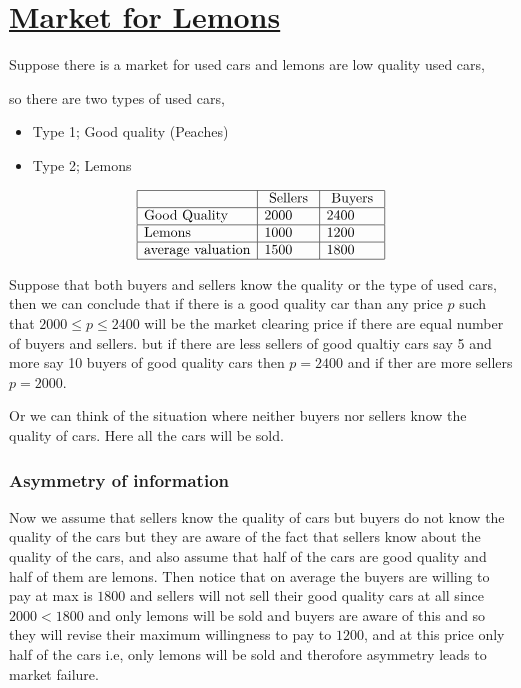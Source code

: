 \documentclass[12pt,a4paper]{article}
\begin{document}
 \section{\underline{Market for Lemons}} 
Suppose there is a market for used cars and lemons are low quality used cars,

so there are two types of used cars, 

\begin{itemize}
    \item Type 1; Good quality (Peaches)

    \item Type 2; Lemons
\end{itemize}

 \begin{align*}
    \begin{array}{|l|l|l|}
    \hline & \text{ Sellers } & \text { Buyers } \\
    \hline \text{Good Quality} & 2000 & 2400 \\
    \hline \text{Lemons} & 1000 & 1200\\
    \hline \text{average valuation} & 1500 & 1800\\
    \hline
    \end{array}
    \end{align*}

Suppose that both buyers and sellers know the quality or the type of used cars, then we can conclude that if there is a good quality car than any price \(p\) such that \(2000 \leq p \leq 2400\)  will be the market clearing price if there are equal number of buyers and sellers. but if there are less sellers of good qualtiy cars say 5 and more say 10 buyers of good quality cars then \(p=2400\) and if ther are more sellers \(p=2000\).  

Or we can think of the situation where neither buyers nor sellers know the quality of cars. Here all the cars will be sold.


 \subsubsection*{ Asymmetry of information } 
Now we assume that sellers know the quality of cars but buyers do not know the quality of the cars but they are aware of the fact that sellers know about the quality of the cars, and also assume that half of the cars are good quality and half of them are lemons. Then notice that on average the buyers are willing to pay at max is \(1800\) and sellers will not sell their good quality cars at all since \(2000<1800\)  and only lemons will be sold and buyers are aware of this and so they will revise their maximum willingness to pay to \(1200\),  and at this price only half of the cars i.e, only lemons will be sold and therofore asymmetry leads to market failure.
 
\end{document}

